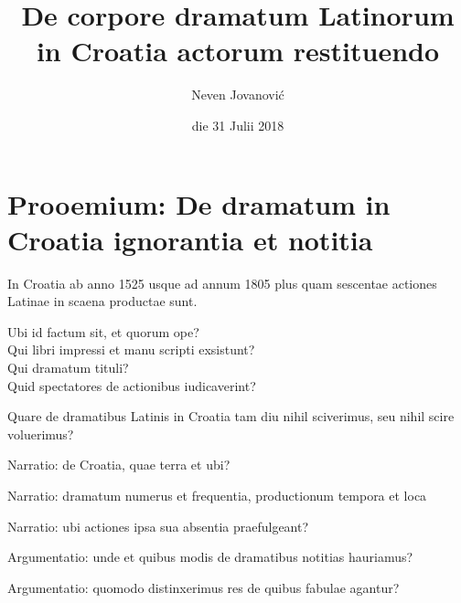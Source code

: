 \documentclass[14pt]{beamer}
\title{De corpore dramatum Latinorum in Croatia actorum restituendo}
\date{die 31 Julii 2018}
\author{Neven Jovanović}
\institute{Facultas philosophica Universitatis Zagrabiensis}
\begin{document}
  \maketitle
  



\section{Prooemium: De dramatum in Croatia ignorantia et notitia}

\begin{frame}
  In Croatia ab anno 1525 usque ad annum 1805 plus quam sescentae actiones Latinae in scaena productae sunt.
\end{frame}

\begin{frame}
  Ubi id factum sit, et quorum ope?\\
  Qui libri impressi et manu scripti exsistunt?\\
  Qui dramatum tituli?\\
  Quid spectatores de actionibus iudicaverint?\\
\end{frame}

\begin{frame}
  Quare de dramatibus Latinis in Croatia tam diu nihil sciverimus, seu nihil scire voluerimus?
\end{frame}

\begin{frame}
Narratio: de Croatia, quae terra et ubi?
\end{frame}

\begin{frame}
Narratio: dramatum numerus et frequentia, productionum tempora et loca
\end{frame}

\begin{frame}
Narratio: ubi actiones ipsa sua absentia praefulgeant?
\end{frame}

\begin{frame}
Argumentatio: unde et quibus modis de dramatibus notitias hauriamus?
\end{frame}

\begin{frame}
Argumentatio: quomodo distinxerimus res de quibus fabulae agantur?
\end{frame}
\end{document}

